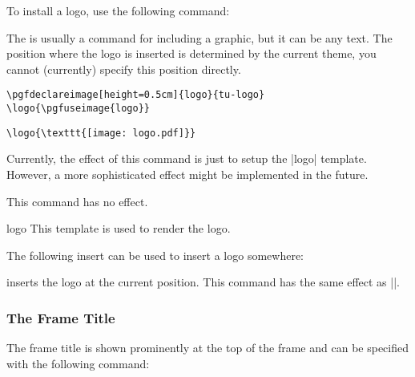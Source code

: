 To install a logo, use the following command:

\begin{command}{\logo{}}
  The  is usually a command for including a graphic,
  but it can be any text. The position where the logo is inserted is
  determined by the current theme, you cannot (currently) specify this
  position directly.
  
  \example
\begin{verbatim}
\pgfdeclareimage[height=0.5cm]{logo}{tu-logo}
\logo{\pgfuseimage{logo}}
\end{verbatim}

  \example
\begin{verbatim}
\logo{\texttt{[image: logo.pdf]}}
\end{verbatim}

  Currently, the effect of this command is just to setup the |logo|
  template. However, a more sophisticated effect might be implemented
  in the future.
  
  \articlenote This command has no effect.

  \begin{element}{logo}\yes\yes\yes
    This template is used to render the logo.
  \end{element}

  The following insert can be used to insert a logo somewhere:
  \begin{itemize}
    \iteminsert{\insertlogo}
    inserts the logo at the current position. This command has the
    same effect as ||.
  \end{itemize}
\end{command}


\subsubsection{The Frame Title}

The frame title is shown prominently at the top of the frame and can
be specified with the following command:

